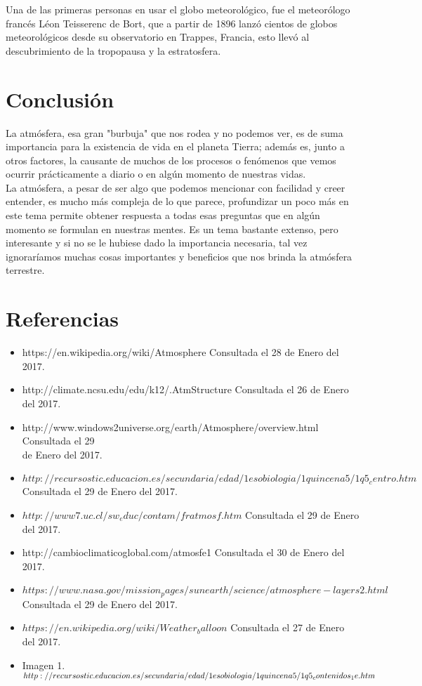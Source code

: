 \documentclass{article}
\begin{document}
\begin{doublespace}
Una de las primeras personas en usar el globo meteorológico, fue el meteorólogo francés Léon Teisserenc de Bort, que a partir de 1896 lanzó cientos de globos meteorológicos desde su observatorio en Trappes, Francia, esto llevó al descubrimiento de la tropopausa y la estratosfera.

\section{Conclusión}
La atmósfera, esa gran "burbuja" que nos rodea y no podemos ver, es de suma importancia para la existencia de vida en el planeta Tierra; además es, junto a otros factores, la causante de muchos de los procesos o fenómenos que vemos ocurrir prácticamente a diario o en algún momento de nuestras vidas.
\\

La atmósfera, a pesar de ser algo que podemos mencionar con facilidad y creer entender, es mucho más compleja de lo que parece, profundizar un poco más en este tema permite obtener respuesta a todas esas preguntas que en algún momento se formulan en nuestras mentes. Es un tema bastante extenso, pero interesante y si no se le hubiese dado la importancia necesaria, tal vez ignoraríamos muchas cosas importantes y beneficios que nos brinda la atmósfera terrestre. 
\\

\section*{Referencias}
\begin{itemize}
    \item https://en.wikipedia.org/wiki/Atmosphere Consultada el 28 de Enero del 2017.
    \item http://climate.ncsu.edu/edu/k12/.AtmStructure Consultada el 26 de Enero del 2017.
    \item	http://www.windows2universe.org/earth/Atmosphere/overview.html Consultada el 29 
    \\de Enero del 2017.
    \item	$http://recursostic.educacion.es/secundaria/edad/1esobiologia/1quincena5/1q5_centro.htm$ Consultada el 29 de Enero del 2017.
    \item $http://www7.uc.cl/sw_educ/contam/fratmosf.htm$ Consultada el 29 de Enero del 2017.
    \item http://cambioclimaticoglobal.com/atmosfe1 Consultada el 30 de Enero del 2017.
    \item $https://www.nasa.gov/mission_pages/sunearth/science/atmosphere-layers2.html$ Consultada el 29 de Enero del 2017.
    \item $https://en.wikipedia.org/wiki/Weather_balloon$ Consultada el 27 de Enero del 2017.
    \item Imagen 1. $http://recursostic.educacion.es/secundaria/edad/1esobiologia/1quincena5
\\/1q5_contenidos_1e.htm$
  
    
\end{itemize}


\end{doublespace}
\end{document}
